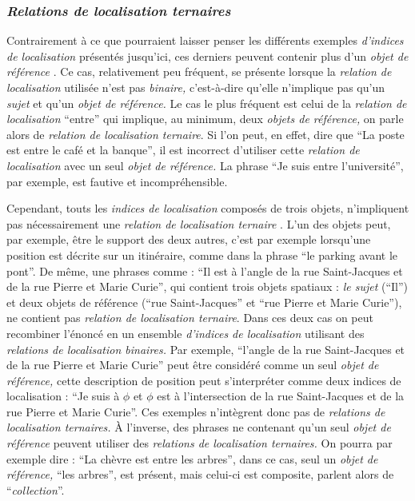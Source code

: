 \subsubsection{\emph{Relations de localisation ternaires}}

Contrairement à ce que pourraient laisser penser les différents
exemples \emph{d'indices de localisation} présentés jusqu'ici, ces
derniers peuvent contenir plus d'un \emph{objet de référence}
\autocite{Clementini2013}. Ce cas, relativement peu fréquent, se
présente lorsque la \emph{relation de localisation} utilisée n'est pas
\emph{binaire,} c'est-à-dire qu'elle n'implique pas qu'un \emph{sujet}
et qu'un \emph{objet de référence.} Le cas le plus fréquent est celui
de la \emph{relation de localisation} \enquote{entre} qui implique, au
minimum, deux \emph{objets de référence,} on parle alors de
\emph{relation de localisation ternaire}. Si l'on peut, en effet, dire
que \enquote{La poste est entre le café et la banque}, il est
incorrect d'utiliser cette \emph{relation de localisation} avec un
seul \emph{objet de référence.} La phrase \enquote{Je suis entre
  l'université}, par exemple, est fautive et incompréhensible.

Cependant, touts les \emph{indices de localisation} composés de trois
objets, n'impliquent pas nécessairement une \emph{relation de
  localisation ternaire} \autocite{Duchene2019}. L'un des objets peut,
par exemple, être le support des deux autres, c'est par exemple
lorsqu'une position est décrite sur un itinéraire, comme dans la
phrase \enquote{le parking avant le pont}. De même, une phrases comme
: \enquote{Il est à l'angle de la rue Saint-Jacques et de la rue
  Pierre et Marie Curie}, qui contient trois objets spatiaux :
\emph{le sujet} (\enquote{Il}) et deux objets de référence
(\enquote{rue Saint-Jacques} et \enquote{rue Pierre et Marie Curie}),
ne contient pas \emph{relation de localisation ternaire}. Dans ces
deux cas on peut recombiner l'énoncé en un ensemble \emph{d'indices de
  localisation} utilisant des \emph{relations de localisation
  binaires.} Par exemple, \enquote{l'angle de la rue Saint-Jacques et
  de la rue Pierre et Marie Curie} peut être considéré comme un seul
\emph{objet de référence,} cette description de position peut
s'interpréter comme deux indices de localisation : \enquote{Je suis à
  $\phi$ et $\phi$ est à l'intersection de la rue Saint-Jacques et de
  la rue Pierre et Marie Curie}. Ces exemples n’intègrent donc pas de
\emph{relations de localisation ternaires.} À l'inverse, des phrases
ne contenant qu'un seul \emph{objet de référence} peuvent utiliser des
\emph{relations de localisation ternaires.} On pourra par exemple dire
: \enquote{La chèvre est entre les arbres}, dans ce cas, seul un
\emph{objet de référence,} \enquote{les arbres}, est présent, mais
celui-ci est composite, \textcite{Aurnague1993} parlent alors de
\enquote{\emph{collection}}.


